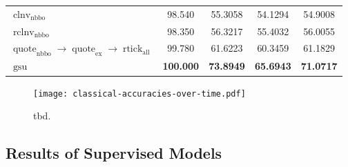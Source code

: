 \begin{table}[H]
\begin{tabular}{lSSSS}
        $\operatorname{clnv}_{\mathrm{nbbo}}$                                                                                 & 98.540            & 55.3058                            & 54.1294           & 54.9008           \\
        $\operatorname{rclnv}_{\mathrm{nbbo}}$                                                                                & 98.350            & 56.3217                            & 55.4032           & 56.0055           \\\midrule
        $\operatorname{quote}_{\mathrm{nbbo}} \to \operatorname{quote}_{\mathrm{ex}} \to \operatorname{rtick}_{\mathrm{all}}$ & 99.780            & 61.6223                            & 60.3459           & 61.1829           \\
        $\operatorname{gsu}$                                                                                                  & \bfseries 100.000 & \bfseries 73.8949                  & \bfseries 65.6943 & \bfseries 71.0717 \\\bottomrule
    \end{tabular}
\end{table}

\begin{figure}[ht]
    \centering
    \texttt{[image: classical-accuracies-over-time.pdf]}
    \caption[tbd]{tbd.}
    \label{fig:classical-accuracies-over-time}
\end{figure}

\subsection{Results of Supervised
    Models}\label{sec:results-of-supervised-models}


